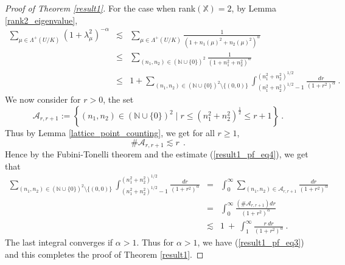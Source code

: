 \documentclass[12pt]{amsart}
\theoremstyle{definition}
\newcommand{\N}{\mathbb N}%
\newcommand{\X}{\mathbb X}%
\numberwithin{equation}{section}
\begin{document}
\begin{proof}[Proof of Theorem \ref{result1}]
For the case when rank$(\X)=2$, by Lemma \ref{rank2_eigenvalue},
\begin{eqnarray*}
\sum_{\mu \in \Lambda^+(U/K)} {(1+\lambda^2_{\mu})}^{-\alpha} &\lesssim & \sum_{\mu \in \Lambda^+(U/K)} \frac{1}{{(1+n_1(\mu)^2+n_2(\mu)^2)}^{\alpha}} \\
& \le & \sum_{(n_1,n_2) \in \left(\N \cup \{0\}\right)^2} \frac{1}{{(1+n^2_1+n^2_2)}^{\alpha}}\\
& \le & 1+ \sum_{(n_1,n_2) \in \left(\N \cup \{0\}\right)^2 \setminus \{(0,0)\}} \int_{{(n^2_1+n^2_2)}^{1/2}-1}^{{(n^2_1+n^2_2)}^{1/2}} \frac{dr}{{(1+r^2)}^\alpha}\:.
\end{eqnarray*}
We now consider for $r>0$, the set
\begin{equation*}
\mathscr{A}_{r,r+1} :=\left\{(n_1,n_2) \in \left(\N \cup \{0\}\right)^2 \mid r \le {(n^2_1+n^2_2)}^{\frac{1}{2}} \le r+1\right\}\:.
\end{equation*}
Thus by Lemma \ref{lattice_point_counting}, we get for all $r \ge 1$,
\begin{equation} \label{result1_pf_eq4}
\#\mathscr{A}_{r,r+1}  \lesssim r\:\:.
\end{equation}
Hence by the Fubini-Tonelli theorem and the estimate (\ref{result1_pf_eq4}), we get that
\begin{eqnarray*}
\sum_{(n_1,n_2) \in \left(\N \cup \{0\}\right)^2 \setminus \{(0,0)\}} \int_{{(n^2_1+n^2_2)}^{1/2}-1}^{{(n^2_1+n^2_2)}^{1/2}} \frac{dr}{{(1+r^2)}^\alpha} &=& \int_0^\infty \sum_{(n_1,n_2) \in \mathscr{A}_{r,r+1}} \frac{dr}{{(1+r^2)}^\alpha} \\
&=&  \int_0^\infty  \frac{\left(\#\mathscr{A}_{r,r+1}\right)dr}{{(1+r^2)}^\alpha} \\
& \lesssim & 1 \:+\:\int_1^\infty  \frac{r\:dr}{{(1+r^2)}^{\alpha}} \:. 
\end{eqnarray*}
The last integral converges if $\alpha>1$. Thus for $\alpha > 1$, we have (\ref{result1_pf_eq3}) and this completes the proof of Theorem \ref{result1}.
\end{proof}
\end{document}

